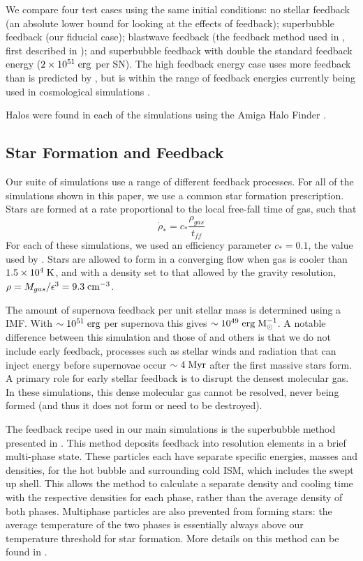 We compare four test cases using the same initial conditions: no stellar
feedback (an absolute lower bound for looking at the effects of feedback);
superbubble feedback (our fiducial case); blastwave feedback (the feedback
method used in \citet{Stinson2010}, first described in \citealt{Stinson2006}); and
superbubble feedback with double the standard feedback energy ($2\times10^{51}\;
\rm{erg}$ per SN).  The high feedback energy case uses more feedback than is
predicted by \citet{Leitherer1999}, but is within the range of feedback energies
currently being used in cosmological simulations \citep{Schaye2015, Agertz2014,
Vogelsberger2013}.  

Halos were found in each of the simulations using the Amiga Halo Finder
\citep[AHF;][]{Knollmann2009}.

\subsection{Star Formation and Feedback}
Our suite of simulations use a range of different feedback
processes.  For all of the simulations shown in this paper, we use a common
star formation prescription.  Stars are formed at a rate proportional to the
local free-fall time of gas, such that
\begin{equation}
    \dot \rho_* = c_* \frac{\rho_{gas}}{t_{ff}}
    \label{sflaw}
\end{equation}
For each of these simulations, we used an efficiency parameter $c_* = 0.1$, the
value used by \citet{Stinson2013}.  Stars are allowed to form in a converging
flow when gas is cooler than $1.5\times10^4\; \rm{K}$, and with a density set to
that allowed by the gravity resolution, $\rho = M_{gas}/\epsilon^3 = 9.3\;
\rm{cm^{-3}}$.

The amount of supernova feedback per unit stellar mass is determined using a
\citet{Chabrier2003} IMF.  With $\sim10^{51}\; \rm{erg}$ per supernova this
gives $\sim10^{49}\; \rm{erg\;M^{-1}_{\odot}}$.   A notable difference between
this simulation and those of \citet{Stinson2013} and others is that we do not
include early feedback, processes such as stellar winds and radiation that can
inject energy before supernovae occur $\sim 4\; \rm{Myr}$ after the first
massive stars form.  A primary role for early stellar feedback is to disrupt the
densest molecular gas.  In these simulations, this dense molecular gas cannot be
resolved, never being formed (and thus it does not form or need to be
destroyed).

The feedback recipe used in our main simulations is the superbubble method
presented in \citet{Keller2014}.  This method deposits feedback into resolution
elements in a brief multi-phase state.  These particles each have separate
specific energies, masses and densities, for the hot bubble and surrounding cold
ISM, which includes the swept up shell.  This allows the method to calculate a
separate density and cooling time with the respective densities for each phase,
rather than the average density of both phases.  Multiphase particles are also
prevented from forming stars: the average temperature of the two phases is
essentially always above our temperature threshold for star formation.  More
details on this method can be found in \citet{Keller2014}.

